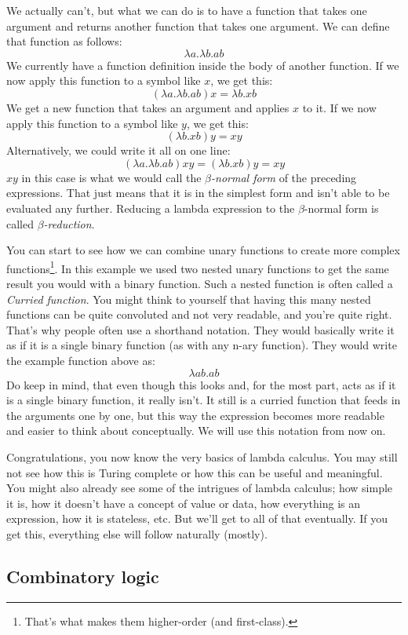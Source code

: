\documentclass[11pt]{article}
\begin{document}
We actually can't, but what we can do is to have a function that takes one
argument and returns another function that takes one argument. We can define
that function as follows:
\[\lambda a.\lambda b.ab\]
We currently have a function definition inside the body of another function. If
we now apply this function to a symbol like \(x\), we get this:
\[(\lambda a.\lambda b.ab)x=\lambda b.xb\]
We get a new function that takes an argument and applies \(x\) to it. If we now
apply this function to a symbol like \(y\), we get this:
\[(\lambda b.xb)y=xy\]
Alternatively, we could write it all on one line:
\[(\lambda a.\lambda b.ab)xy=(\lambda b.xb)y=xy\]
\(xy\) in this case is what we would call the \emph{\(\beta\)-normal form} of
the preceding expressions. That just means that it is in the simplest form and
isn't able to be evaluated any further. Reducing a lambda expression to the
\(\beta\)-normal form is called \emph{\(\beta\)-reduction}.

You can start to see how we can combine unary functions to create more complex
functions\footnote{That's what makes them higher-order (and first-class).}. In
this example we used two nested unary functions to get the same result you
would with a binary function. Such a nested function is often called a
\emph{Curried function}.
You might think to yourself that having this many nested functions can be quite
convoluted and not very readable, and you're quite right. That's why people
often use a shorthand notation. They would basically write it as if it is a
single binary function (as with any n-ary function). They would write the
example function above as:
\[\lambda ab.ab\]
Do keep in mind, that even though this looks and, for the most part, acts as if
it is a single binary function, it really isn't. It still is a curried function
that feeds in the arguments one by one, but this way the expression becomes
more readable and easier to think about conceptually. We will use this notation
from now on.

Congratulations, you now know the very basics of lambda calculus. You may still
not see how this is Turing complete or how this can be useful and meaningful.
You might also already see some of the intrigues of lambda calculus; how simple
it is, how it doesn't have a concept of value or data, how everything is an
expression, how it is stateless, etc. But we'll get to all of that eventually.
If you get this, everything else will follow naturally (mostly).

\subsection{Combinatory logic}\label{combinatorylogic}
\end{document}
